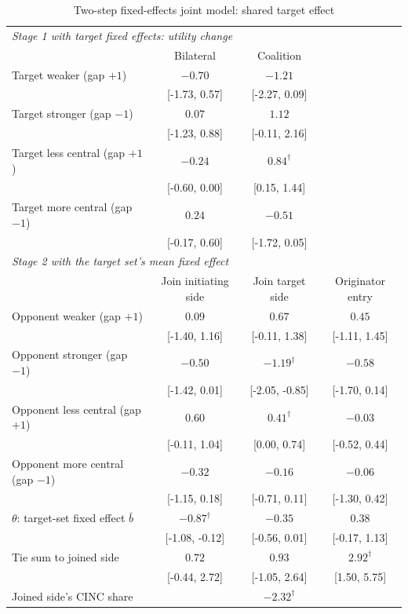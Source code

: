\begin{table}[!htbp]\centering\small
\caption{Two-step fixed-effects joint model: shared target effect}\label{tab:jointfe}
\begin{tabular}{lccc}
\toprule
\multicolumn{4}{l}{\emph{Stage 1 with target fixed effects: utility change}} \\
 & Bilateral & Coalition & \\
Target weaker (gap $+1$) & $-0.70$ & $-1.21$ &  \\
 & [-1.73, 0.57] & [-2.27, 0.09] &  \\
Target stronger (gap $-1$) & $0.07$ & $1.12$ &  \\
 & [-1.23, 0.88] & [-0.11, 2.16] &  \\
Target less central (gap $+1$) & $-0.24$ & $0.84^{\dagger}$ &  \\
 & [-0.60, 0.00] & [0.15, 1.44] &  \\
Target more central (gap $-1$) & $0.24$ & $-0.51$ &  \\
 & [-0.17, 0.60] & [-1.72, 0.05] &  \\
\midrule
\multicolumn{4}{l}{\emph{Stage 2 with the target set's mean fixed effect}} \\
 & Join initiating side & Join target side & Originator entry \\
Opponent weaker (gap $+1$) & $0.09$ & $0.67$ & $0.45$ \\
 & [-1.40, 1.16] & [-0.11, 1.38] & [-1.11, 1.45] \\
Opponent stronger (gap $-1$) & $-0.50$ & $-1.19^{\dagger}$ & $-0.58$ \\
 & [-1.42, 0.01] & [-2.05, -0.85] & [-1.70, 0.14] \\
Opponent less central (gap $+1$) & $0.60$ & $0.41^{\dagger}$ & $-0.03$ \\
 & [-0.11, 1.04] & [0.00, 0.74] & [-0.52, 0.44] \\
Opponent more central (gap $-1$) & $-0.32$ & $-0.16$ & $-0.06$ \\
 & [-1.15, 0.18] & [-0.71, 0.11] & [-1.30, 0.42] \\
$\theta$: target-set fixed effect $\bar b$ & $-0.87^{\dagger}$ & $-0.35$ & $0.38$ \\
 & [-1.08, -0.12] & [-0.56, 0.01] & [-0.17, 1.13] \\
Tie sum to joined side & $0.72$ & $0.93$ & $2.92^{\dagger}$ \\
 & [-0.44, 2.72] & [-1.05, 2.64] & [1.50, 5.75] \\
Joined side's CINC share &  & $-2.32^{\dagger}$ &  \\

\end{tabular}
\end{table}

